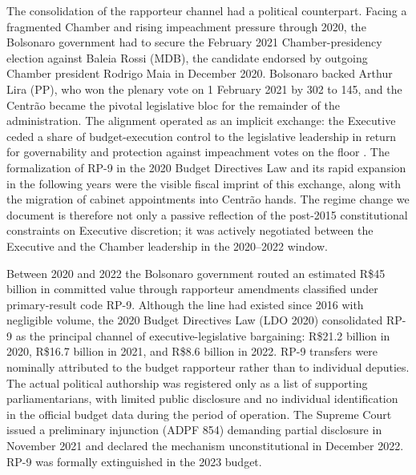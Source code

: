 \documentclass[preprint,12pt,authoryear]{elsarticle}
\begin{document}
The consolidation of the rapporteur channel had a political counterpart. Facing a fragmented Chamber and rising impeachment pressure through 2020, the Bolsonaro government had to secure the February 2021 Chamber-presidency election against Baleia Rossi (MDB), the candidate endorsed by outgoing Chamber president Rodrigo Maia in December 2020. Bolsonaro backed Arthur Lira (PP), who won the plenary vote on 1 February 2021 by 302 to 145, and the Centr\~ao became the pivotal legislative bloc for the remainder of the administration. The alignment operated as an implicit exchange: the Executive ceded a share of budget-execution control to the legislative leadership in return for governability and protection against impeachment votes on the floor \citep{GrazianeEtAl2022RP9,BrazilReports2022SecretBudget}. The formalization of RP-9 in the 2020 Budget Directives Law and its rapid expansion in the following years \citep{TCU2022RelatorioContas} were the visible fiscal imprint of this exchange, along with the migration of cabinet appointments into Centr\~ao hands. The regime change we document is therefore not only a passive reflection of the post-2015 constitutional constraints on Executive discretion; it was actively negotiated between the Executive and the Chamber leadership in the 2020--2022 window.

Between 2020 and 2022 the Bolsonaro government routed an estimated R\$45 billion in committed value through rapporteur amendments classified under primary-result code RP-9. Although the line had existed since 2016 with negligible volume, the 2020 Budget Directives Law (LDO 2020) consolidated RP-9 as the principal channel of executive-legislative bargaining: R\$21.2 billion in 2020, R\$16.7 billion in 2021, and R\$8.6 billion in 2022. RP-9 transfers were nominally attributed to the budget rapporteur rather than to individual deputies. The actual political authorship was registered only as a list of supporting parliamentarians, with limited public disclosure and no individual identification in the official budget data during the period of operation. The Supreme Court issued a preliminary injunction (ADPF 854) demanding partial disclosure in November 2021 and declared the mechanism unconstitutional in December 2022. RP-9 was formally extinguished in the 2023 budget.
\end{document}

